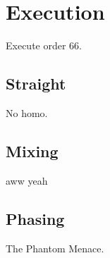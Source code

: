 \chapter{Execution}

Execute order 66.

\section{Straight}

No homo.

\section{Mixing}

aww yeah

\section{Phasing}

The Phantom Menace.

